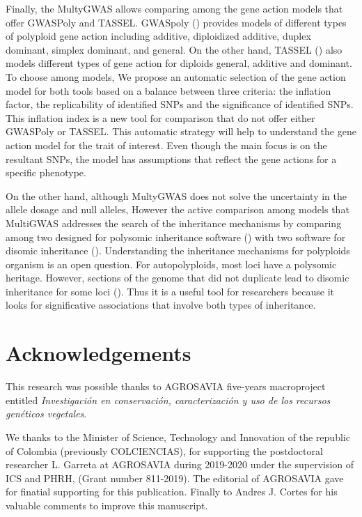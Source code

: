 \documentclass{article}
\begin{document}
Finally, the MultyGWAS allows comparing among the gene action models that offer GWASPoly and TASSEL.  GWASpoly (\cite{Rosyara2016}) provides models of different types of polyploid gene action including additive, diploidized additive, duplex dominant, simplex dominant, and general. On the other hand, TASSEL (\cite{Bradbury2007}) also models different types of gene action for diploids general, additive and dominant. To choose among models, We propose an automatic selection of the gene action model for both tools based on a balance between three criteria: the inflation factor, the replicability of identified SNPs and the significance of identified SNPs. 
This inflation index is a new tool for comparison that do not offer either GWASPoly or TASSEL. This automatic strategy will help to understand the gene action model for the trait of interest. Even though the main focus is on the resultant SNPs, the model has assumptions that reflect the gene actions for a specific phenotype.

On the other hand, although MultyGWAS does not solve the uncertainty in the allele dosage and null alleles, However the active comparison among models that MultiGWAS addresses the search of the inheritance mechanisms by comparing among two designed for polysomic inheritance software (\cite{Rosyara2016, Shen2016}) with two software for disomic inheritance (\cite{Purcell2007, Bradbury2007}). Understanding the inheritance mechanisms for polyploids organism is an open question. For autopolyploids, most loci have a polysomic heritage. However, sections of the genome that did not duplicate lead to disomic inheritance for some loci (\cite{ohno1970, lynch2000,dufresne2014}). Thus it is a useful tool for researchers because it looks for significative associations that involve both types of inheritance.





\section{Acknowledgements}
This research was possible thanks to AGROSAVIA five-years macroproject entitled \emph{Investigación en conservación, caracterización y uso de los recursos genéticos vegetales}.
 
We thanks to the Minister of Science, Technology and Innovation of the republic of Colombia (previously COLCIENCIAS), for supporting the postdoctoral researcher L. Garreta at AGROSAVIA during 2019-2020 under the supervision of ICS and PHRH, (Grant number 811-2019). The editorial of AGROSAVIA gave for finatial supporting for this publication. Finally to Andres J. Cortes for his valuable comments to improve this manuscript.
\end{document}
